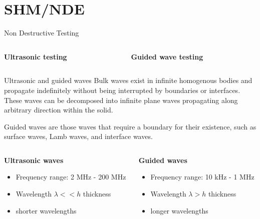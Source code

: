 \documentclass[10pt,aspectratio=169,dvipsnames]{beamer} %
\begin{document}
\section{SHM/NDE}
\begin{frame}{Non Destructive Testing}
	\begin{columns}[T]
		\begin{column}{0.5\textwidth}
			\centering
			\hspace{2cm}\textbf{Ultrasonic testing}	
		\end{column}
		\begin{column}{0.5\textwidth}
			\centering
			\hspace{-2cm}\textbf{Guided wave testing}	
		\end{column}
	\end{columns}	
\begin{figure}
\end{figure}
\end{frame}
\begin{frame}{Ultrasonic and guided waves}
\alert{Bulk waves} exist in infinite homogenous bodies and propagate indefinitely without being interrupted by boundaries or interfaces. 
These waves can be decomposed into infinite plane waves propagating along arbitrary direction within the solid.
	
\alert{Guided waves} are those waves that require a boundary for their existence, such as surface waves, Lamb waves, and interface waves.
	\vspace{5mm}
	\begin{columns}[T]
		\begin{column}{0.45\textwidth}
			\textbf{Ultrasonic waves}	
			\begin{itemize}
				\item Frequency range: 2 MHz - 200 MHz
				\item Wavelength \(\lambda << h\) thickness 
				\item shorter wavelengths
			\end{itemize}
		\end{column}
		\begin{column}{0.45\textwidth}
			\textbf{Guided waves}	
			\begin{itemize}
				\item Frequency range: 10 kHz - 1 MHz
				\item Wavelength \(\lambda > h\) thickness 
				\item longer wavelengths
			\end{itemize}
		\end{column}
	\end{columns}			
\end{frame}
\end{document}
